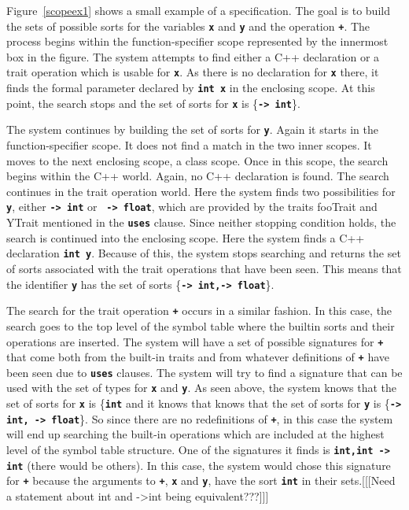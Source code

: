 \documentclass[12pt]{article} %
\newcommand{\reserved}[1]{\textbf{\texttt{#1}}} %
\begin{document}
Figure~\ref{scopeex1} shows a small example of a specification. The
goal is to build the sets of possible sorts for the variables
\reserved{x} and \reserved{y} and the operation \reserved{+}. The
process begins within the function-specifier scope represented by the
innermost box in the figure. The system attempts to find either a C++
declaration or a trait operation which is usable for \reserved{x}. As
there is no declaration for \reserved{x} there, it finds the formal
parameter declared by \reserved{int x} in the enclosing scope. At this
point, the search stops and the set of sorts for \reserved{x} is
\{\reserved{-> int}\}.

The system continues by building the set of sorts for
\reserved{y}. Again it starts in the function-specifier scope. It does
not find a match in the two inner scopes. It moves to the next
enclosing scope, a class scope. Once in this scope, the search begins
within the C++ world. Again, no C++ declaration is found. The search
continues in the trait operation world. Here the system finds two
possibilities for \reserved{y}, either \reserved{-> int} or \reserved{
-> float}, which are provided by the traits fooTrait and YTrait
mentioned in the
\reserved{uses} clause. Since neither stopping condition holds, the search is continued into the enclosing scope. Here the
system finds a C++ declaration \reserved{int y}. Because of this, the
system stops searching and returns the set of sorts associated with the trait
operations that have been seen. 
This means that the
identifier
\reserved{y} has the set of sorts \{\reserved{-> int,-> float}\}. 


The search for the trait operation \reserved{+} occurs in a similar
fashion. In this case, the search goes to the top level of the symbol
table where the builtin sorts and their operations are inserted. The
system will have a set of possible signatures for \reserved{+} that come
both from the built-in traits and from whatever definitions of
\reserved{+} have been seen due to \reserved{uses} clauses. The system 
will try to find a signature that can be used with the set of types
for \reserved{x} and \reserved{y}. As seen above, the system knows
that the set of sorts for \reserved{x} is \{\reserved{int} and it
knows that knows that the set of sorts for \reserved{y} is
\{\reserved{-> int, -> float}\}. So since there are no redefinitions
of \reserved{+}, in this case the system will end up searching the
built-in operations which are included at the highest level of the
symbol table structure. One of the signatures it finds is
\reserved{int,int -> int} (there would be others). In this case, the 
system would chose this signature for \reserved{+} because the
arguments to \reserved{+}, \reserved{x} and \reserved{y}, have the
sort \reserved{int} in their sets.[[[Need a statement about int and
->int being equivalent???]]] 
\end{document}

